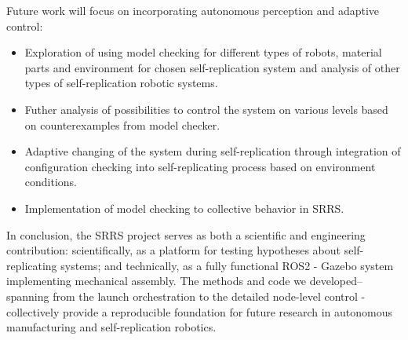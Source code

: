 Future work will focus on incorporating autonomous perception and adaptive 
control:
\begin{itemize}
    \item Exploration of using model checking for different types of robots, 
        material parts and environment for chosen self-replication system
        and analysis of other types of self-replication robotic systems.
    \item Futher analysis of possibilities to control the system on various levels
        based on counterexamples from model checker.
    \item Adaptive changing of the system during self-replication
        through integration of configuration checking into self-replicating process 
        based on environment conditions.
    \item Implementation of model checking to collective behavior in SRRS.
\end{itemize}


In conclusion, the SRRS project serves as both a scientific and engineering 
contribution: scientifically, as a platform for testing hypotheses about 
self-replicating systems;
and technically, as a fully functional ROS2 - Gazebo system implementing mechanical assembly. 
The methods and code we developed--spanning from the launch orchestration
 to the detailed node-level control -collectively provide a reproducible foundation for 
future research in autonomous manufacturing and self-replication robotics.

